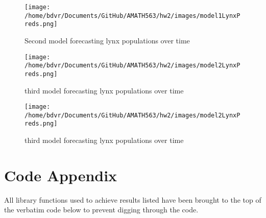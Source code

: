 \documentclass[12pt]{article}
\begin{document}
\begin{figure}[H]
	\texttt{[image: /home/bdvr/Documents/GitHub/AMATH563/hw2/images/model1LynxPreds.png]}
	\caption{Second model forecasting lynx populations over time}
\end{figure}
\begin{figure}[H]
	\texttt{[image: /home/bdvr/Documents/GitHub/AMATH563/hw2/images/model2LynxPreds.png]}
	\caption{third model forecasting lynx populations over time}
\end{figure}
\begin{figure}[H]
	\texttt{[image: /home/bdvr/Documents/GitHub/AMATH563/hw2/images/model2LynxPreds.png]}
	\caption{third model forecasting lynx populations over time}
\end{figure}

	\section{Code Appendix}
	All library functions used to achieve results listed have been brought to the top of the verbatim code below to prevent digging through the code.
\end{document}
